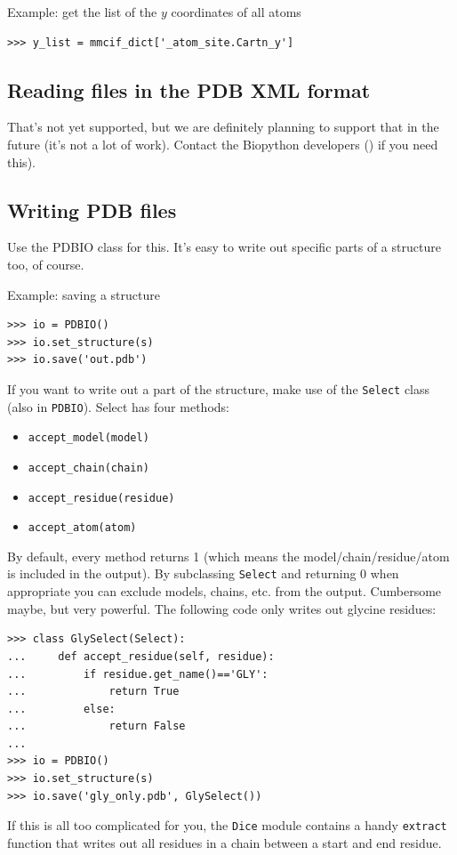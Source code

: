 \documentclass{report}
\begin{document}
Example: get the list of the $y$ coordinates of all atoms
\begin{verbatim}
>>> y_list = mmcif_dict['_atom_site.Cartn_y']
\end{verbatim}

\subsection{Reading files in the PDB XML format}

That's not yet supported, but we are definitely planning to support that
in the future (it's not a lot of work). Contact the Biopython developers
() if you need this).

\subsection{Writing PDB files}

Use the PDBIO class for this. It's easy to write out specific parts
of a structure too, of course.

Example: saving a structure

\begin{verbatim}
>>> io = PDBIO()
>>> io.set_structure(s)
>>> io.save('out.pdb')
\end{verbatim}
If you want to write out a part of the structure, make use of the
\texttt{Select} class (also in \texttt{PDBIO}). Select has four methods:

\begin{itemize}
\item \verb+accept_model(model)+
\item \verb+accept_chain(chain)+
\item \verb+accept_residue(residue)+
\item \verb+accept_atom(atom)+
\end{itemize}
By default, every method returns 1 (which means the model/\-chain/\-residue/\-atom
is included in the output). By subclassing \texttt{Select} and returning
0 when appropriate you can exclude models, chains, etc. from the output.
Cumbersome maybe, but very powerful. The following code only writes
out glycine residues:

\begin{verbatim}
>>> class GlySelect(Select):
...     def accept_residue(self, residue):
...         if residue.get_name()=='GLY':
...             return True
...         else:
...             return False
... 
>>> io = PDBIO()
>>> io.set_structure(s)
>>> io.save('gly_only.pdb', GlySelect())
\end{verbatim}
If this is all too complicated for you, the \texttt{Dice} module contains
a handy \texttt{extract} function that writes out all residues in
a chain between a start and end residue. 
\end{document}
